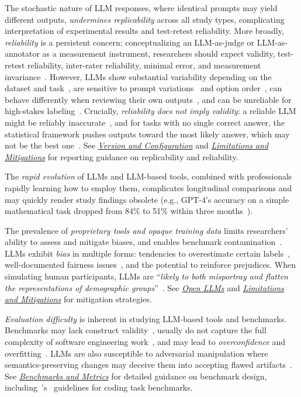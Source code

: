 \documentclass[smallextended]{svjour3}
\newcommand*{\enq}[1]{\enquote{{\itshape#1}}}
\newcommand{\modelversion}{\hyperref[sec:report-model-version-configuration-and-customizations]{\emph{Version and Configuration}}\xspace}
\newcommand{\benchmarksmetrics}{\hyperref[sec:use-suitable-baselines-benchmarks-and-metrics]{\emph{Benchmarks and Metrics}}\xspace}
\newcommand{\openllm}{\hyperref[sec:use-an-open-llm-as-a-baseline]{\emph{Open LLMs}}\xspace}
\newcommand{\limitationsmitigations}{\hyperref[sec:report-limitations-and-mitigations]{\emph{Limitations and Mitigations}}\xspace}
\newcommand{\modelversion}{\href{/guidelines\#report-model-version-configuration-and-customizations}{\emph{Version and Configuration}}\xspace}
\newcommand{\benchmarksmetrics}{\href{/guidelines\#use-suitable-baselines-benchmarks-and-metrics}{\emph{Benchmarks and Metrics}}\xspace}
\newcommand{\openllm}{\href{/guidelines\#use-an-open-llm-as-a-baseline}{\emph{Open LLMs}}\xspace}
\newcommand{\limitationsmitigations}{\href{/guidelines\#report-limitations-and-mitigations}{\emph{Limitations and Mitigations}}\xspace}
\begin{document}
The stochastic nature of LLM responses, where identical prompts may yield different outputs, \emph{undermines replicability} across all study types, complicating interpretation of experimental results and test-retest reliability. More broadly, \emph{reliability} is a persistent concern: conceptualizing an LLM-as-judge or LLM-as-annotator as a measurement instrument, researchers should expect validity, test-retest reliability, inter-rater reliability, minimal error, and measurement invariance~\cite{DBLP:books/sp/24/RalphKAA24}. However, LLMs show substantial variability depending on the dataset and task~\cite{DBLP:journals/corr/abs-2306-00176}, are sensitive to prompt variations~\cite{DBLP:journals/corr/abs-2304-11085} and option order~\cite{DBLP:conf/naacl/PezeshkpourH24}, can behave differently when reviewing their own outputs~\cite{DBLP:conf/nips/PanicksseryBF24}, and can be unreliable for high-stakes labeling~\cite{DBLP:conf/chi/Wang0RMM24}. Crucially, \emph{reliability does not imply validity}: a reliable LLM might be reliably inaccurate~\cite{DBLP:conf/coling/ZhouC024}, and for tasks with no single correct answer, the statistical framework pushes outputs toward the most likely answer, which may not be the best one~\cite{DBLP:journals/corr/abs-2406-18403}. See \modelversion and \limitationsmitigations for reporting guidance on replicability and reliability.

The \emph{rapid evolution} of LLMs and LLM-based tools, combined with professionals rapidly learning how to employ them, complicates longitudinal comparisons and may quickly render study findings obsolete (e.g., GPT-4's accuracy on a simple mathematical task dropped from 84\% to 51\% within three months~\cite{DBLP:journals/corr/abs-2307-09009}).

The prevalence of \emph{proprietary tools and opaque training data} limits researchers' ability to assess and mitigate biases, and enables benchmark contamination~\cite{DBLP:journals/corr/abs-2410-16186}. LLMs exhibit \emph{bias} in multiple forms: tendencies to overestimate certain labels~\cite{DBLP:journals/corr/abs-2304-10145}, well-documented fairness issues~\cite{DBLP:journals/coling/GallegosRBTKDYZA24}, and the potential to reinforce prejudices. When simulating human participants, LLMs are \enq{likely to both misportray and flatten the representations of demographic groups}~\cite{DBLP:journals/natmi/WangMD25}. See \openllm and \limitationsmitigations for mitigation strategies.

\emph{Evaluation difficulty} is inherent in studying LLM-based tools and benchmarks. Benchmarks may lack construct validity~\cite{DBLP:books/sp/24/RalphKAA24}, usually do not capture the full complexity of software engineering work~\cite{Chandra2025benchmarks}, and may lead to \emph{overconfidence} and overfitting~\cite{DBLP:conf/kdd/WanSJKCNSSWYABJ24}. LLMs are also susceptible to adversarial manipulation where semantics-preserving changes may deceive them into accepting flawed artifacts~\cite{DBLP:journals/corr/abs-2510-24367}. See \benchmarksmetrics for detailed guidance on benchmark design, including~\citeauthor{cao2025should}'s~\cite{cao2025should} guidelines for coding task benchmarks.
\end{document}
